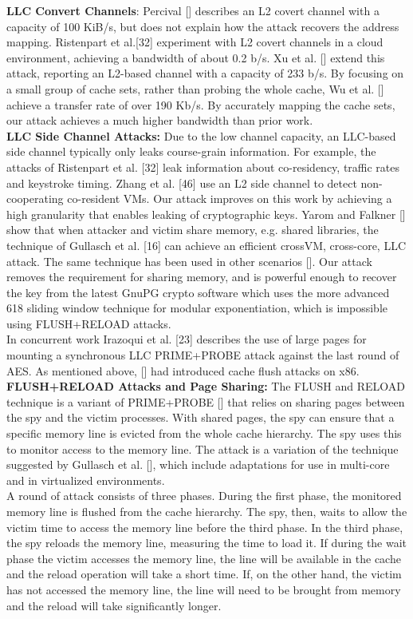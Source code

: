 \documentclass{sig-alternate}
\begin{document}
\textbf{LLC Convert Channels}: Percival [] describes an L2 covert channel with a capacity of 100 KiB/s, but does not explain how the attack recovers the address mapping. Ristenpart et al.[32] experiment with L2 covert channels in a cloud environment, achieving a bandwidth of about 0.2 b/s. Xu et al. [] extend this attack, reporting an L2-based channel with a capacity of 233 b/s. By focusing on a small group of cache sets, rather than probing the whole cache, Wu et al. [] achieve a transfer rate of over 190 Kb/s. By accurately mapping the cache sets, our attack achieves a much higher bandwidth than prior work.
\\
\indent
\textbf{LLC Side Channel Attacks:} Due to the low channel capacity, an LLC-based side channel typically only leaks course-grain information. For example, the attacks of Ristenpart et al. [32] leak information about co-residency, traffic rates and keystroke timing. Zhang et al. [46] use an L2 side channel to detect non-cooperating co-resident VMs. Our attack improves on this work by achieving a high granularity that enables leaking of cryptographic keys. Yarom and Falkner [] show that when attacker and victim share memory, e.g. shared libraries, the technique of Gullasch et al. [16] can achieve an efficient crossVM, cross-core, LLC attack. The same technique has been used in other scenarios []. Our
attack removes the requirement for sharing memory, and is powerful enough to recover the key from the latest GnuPG crypto software which uses the more advanced 618 sliding window technique for modular exponentiation, which is impossible using FLUSH+RELOAD attacks.
\\
\indent
In concurrent work Irazoqui et al. [23] describes the use of large pages for mounting a synchronous LLC PRIME+PROBE attack against the last round of AES. As mentioned above, [] had introduced cache flush attacks on x86.
\\
\indent
\textbf{FLUSH+RELOAD Attacks and Page Sharing:} The FLUSH and RELOAD technique is a variant of PRIME+PROBE [] that relies on sharing pages between the spy and the victim processes. With shared pages, the spy can ensure that a specific memory line is evicted from the whole cache hierarchy. The spy uses this to monitor access to the memory line. The attack is a variation of the technique suggested by Gullasch et al. [], which include adaptations for use in multi-core and in virtualized environments.
\\
\indent
A round of attack consists of three phases. During the first phase, the monitored memory line is flushed from the cache hierarchy. The spy, then, waits to allow the victim time to access the memory line before the third phase. In the third phase, the spy reloads the memory line, measuring the time to load it. If during the wait phase the victim accesses the memory line, the line will be available in the cache and the reload operation will take a short time. If, on the other hand, the victim has not accessed the memory line, the line will need to be brought from memory and the reload will take significantly longer.
\end{document}
